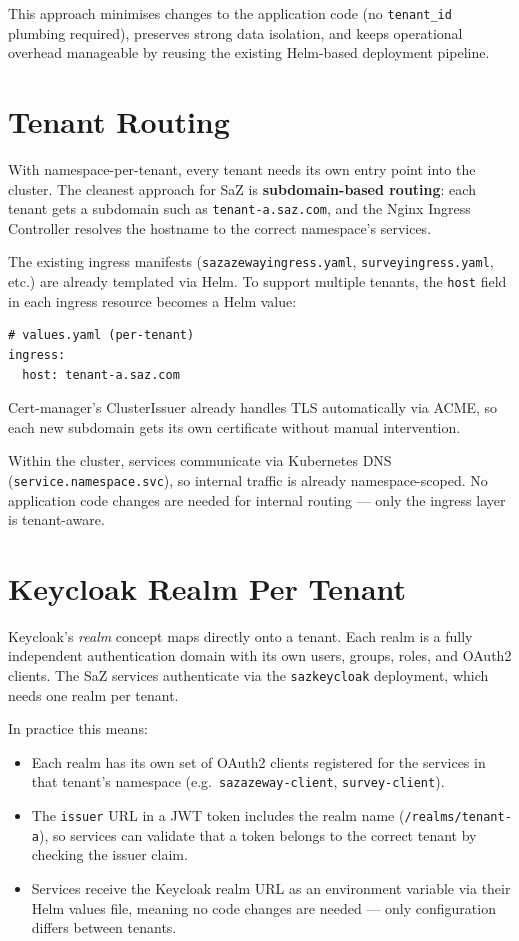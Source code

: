 This approach minimises changes to the application code (no \texttt{tenant\_id} plumbing required), preserves strong data isolation, and keeps operational overhead manageable by reusing the existing Helm-based deployment pipeline.

\section{Tenant Routing}

With namespace-per-tenant, every tenant needs its own entry point into the cluster. The cleanest approach for SaZ is \textbf{subdomain-based routing}: each tenant gets a subdomain such as \texttt{tenant-a.saz.com}, and the Nginx Ingress Controller resolves the hostname to the correct namespace's services.

The existing ingress manifests (\texttt{sazazewayingress.yaml}, \texttt{surveyingress.yaml}, etc.) are already templated via Helm. To support multiple tenants, the \texttt{host} field in each ingress resource becomes a Helm value:

\begin{lstlisting}
# values.yaml (per-tenant)
ingress:
  host: tenant-a.saz.com
\end{lstlisting}

Cert-manager's ClusterIssuer already handles TLS automatically via ACME, so each new subdomain gets its own certificate without manual intervention.

Within the cluster, services communicate via Kubernetes DNS (\texttt{service.namespace.svc}), so internal traffic is already namespace-scoped. No application code changes are needed for internal routing --- only the ingress layer is tenant-aware.

\section{Keycloak Realm Per Tenant}

Keycloak's \emph{realm} concept maps directly onto a tenant. Each realm is a fully independent authentication domain with its own users, groups, roles, and OAuth2 clients. The SaZ services authenticate via the \texttt{sazkeycloak} deployment, which needs one realm per tenant.

In practice this means:

\begin{itemize}
    \item Each realm has its own set of OAuth2 clients registered for the services in that tenant's namespace (e.g.\ \texttt{sazazeway-client}, \texttt{survey-client}).
    \item The \texttt{issuer} URL in a JWT token includes the realm name (\texttt{/realms/tenant-a}), so services can validate that a token belongs to the correct tenant by checking the issuer claim.
    \item Services receive the Keycloak realm URL as an environment variable via their Helm values file, meaning no code changes are needed --- only configuration differs between tenants.
\end{itemize}

